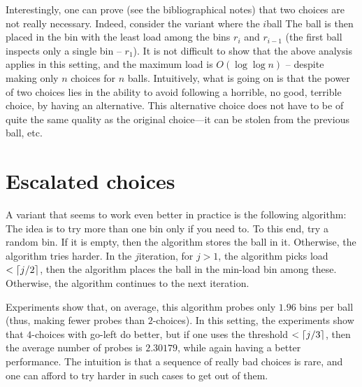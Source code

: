 Interestingly, one can prove (see the bibliographical notes) that two
choices are not really necessary. Indeed, consider the variant where the
$i$\th ball  The ball is then placed in the bin
with the least load among the bins $r_i$ and $r_{i-1}$ (the first ball
inspects only a single bin -- $r_1$). It is not difficult to show that the
above analysis applies in this setting, and the maximum load is
$O( \log \log n)$ -- despite making only $n$ choices for $n$
balls. Intuitively, what is going on is that the power of two choices
lies in the ability to avoid following a horrible, no good, terrible
choice, by having an alternative. This alternative choice does not have
to be of quite the same quality as the original choice---it can be stolen
from the previous ball, etc.



\section{Escalated choices}

A variant that seems to work even better in practice is the following
 algorithm: The idea is to try more than one
bin only if you need to. To this end, try a random bin. If it is
empty, then the algorithm stores the ball in it. Otherwise, the
algorithm tries harder. In the $j$\th iteration, for $j >1$, the
algorithm picks 
load $< \left\lceil {j/2} \right\rceil$, then the algorithm places the ball in the
min-load bin among these. Otherwise, the algorithm continues to the
next iteration.

Experiments show that, on average, this algorithm probes only $1.96$
bins per ball (thus, making fewer probes than $2$-choices). In this
setting, the experiments show that $4$-choices with go-left do
better, but if one uses the threshold $< \left\lceil {j/3} \right\rceil$, then the average
number of probes is $2.30179$, while again having a better
performance. The intuition is that a sequence of really bad choices
is rare, and one can afford to try harder in such cases to get out of
them.

